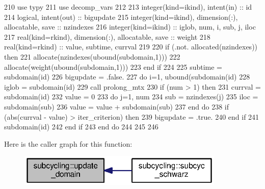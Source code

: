 \begin{DoxyCode}
210         \textcolor{keywordtype}{use }typy
211         \textcolor{keywordtype}{use }decomp_vars
212         
213         \textcolor{keywordtype}{integer(kind=ikind)}, \textcolor{keywordtype}{intent(in)} :: id
214         \textcolor{keywordtype}{logical}, \textcolor{keywordtype}{intent(out)} :: bigupdate
215         \textcolor{keywordtype}{integer(kind=ikind)}, \textcolor{keywordtype}{dimension(:)}, \textcolor{keywordtype}{allocatable}, \textcolor{keywordtype}{save} :: nzindexes
216         \textcolor{keywordtype}{integer(kind=ikind)} :: iglob, num, i, sub, j, iloc
217         \textcolor{keywordtype}{real(kind=rkind)}, \textcolor{keywordtype}{dimension(:)}, \textcolor{keywordtype}{allocatable}, \textcolor{keywordtype}{save} :: weight
218         \textcolor{keywordtype}{real(kind=rkind)} :: \textcolor{keywordtype}{value}, subtime, currval
219         
220         \textcolor{keywordflow}{if} (.not. \textcolor{keyword}{allocated}(nzindexes)) \textcolor{keywordflow}{then}
221           \textcolor{keyword}{allocate}(nzindexes(ubound(subdomain,1)))
222           \textcolor{keyword}{allocate}(weight(ubound(subdomain,1)))
223 \textcolor{keywordflow}{        end if}
224         
225         subtime = subdomain(id)%
226         bigupdate = .false.
227         \textcolor{keywordflow}{do} i=1, ubound(subdomain(id)%
228           iglob = subdomain(id)%
229           \textcolor{keyword}{call }prolong_mtx%
230           \textcolor{keywordflow}{if} (num > 1) \textcolor{keywordflow}{then}
231             currval = subdomain(id)%
232             \textcolor{keywordtype}{value} = 0
233             \textcolor{keywordflow}{do} j=1, num
234               sub = nzindexes(j)
235               iloc = subdomain(sub)%
236               \textcolor{keywordtype}{value} = \textcolor{keywordtype}{value} + subdomain(sub)%
237 \textcolor{keywordflow}{            end do}
238             \textcolor{keywordflow}{if} (abs(currval - \textcolor{keywordtype}{value}) > iter_criterion) \textcolor{keywordflow}{then}
239               bigupdate = .true.
240 \textcolor{keywordflow}{            end if}
241             subdomain(id)%
242 \textcolor{keywordflow}{          end if}
243 \textcolor{keywordflow}{        end do}
244           
245       
246       
\end{DoxyCode}


Here is the caller graph for this function\+:\nopagebreak
\begin{figure}[H]
\begin{center}
\leavevmode
\includegraphics[width=279pt]{namespacesubcycling_abc2715f7cd421516a7858fd44bb02424_icgraph}
\end{center}
\end{figure}


